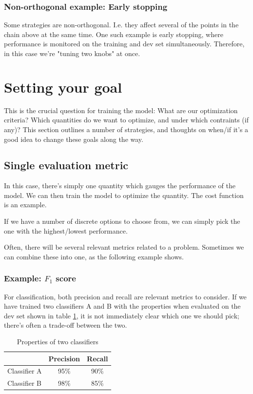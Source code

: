 \documentclass[12pt, a4paper]{article}
\numberwithin{equation}{section}
\begin{document}
\subsubsection{Non-orthogonal example: Early stopping}
Some strategies are non-orthogonal. I.e. they affect several of the points in the chain above at the same time. One such example is early stopping, where performance is monitored on the training and dev set simultaneously. Therefore, in this case we're "tuning two knobs" at once.

\section{Setting your goal}
This is the crucial question for training the model: What are our optimization criteria? Which quantities do we want to optimize, and under which contraints (if any)? This section outlines a number of strategies, and thoughts on when/if it's a good idea to change these goals along the way.

\subsection{Single evaluation metric}
In this case, there's simply one quantity which gauges the performance of the model. We can then train the model to optimize the quantity. The cost function is an example.

If we have a number of discrete options to choose from, we can simply pick the one with the highest/lowest performance.

Often, there will be several relevant metrics related to a problem. Sometimes we can combine these into one, as the following example shows.

\subsubsection{Example: $F_1$ score}
For classification, both precision and recall are relevant metrics to consider. If we have trained two classifiers A and B with the properties when evaluated on the dev set shown in table \ref{table:two_classifiers}, it is not immediately clear which one we should pick; there's often a trade-off between the two.

\begin{table}
\centering
\label{table:two_classifiers}
\begin{tabular}{l|c|c|}
\cline{2-3}
                                   & \multicolumn{1}{l|}{Precision} & \multicolumn{1}{l|}{Recall} \\ \hline
\multicolumn{1}{|l|}{Classifier A} & 95\%                           & 90\%                        \\ \hline
\multicolumn{1}{|l|}{Classifier B} & 98\%                           & 85\%                        \\ \hline
\end{tabular}
\caption{Properties of two classifiers}
\end{table}
\end{document}
